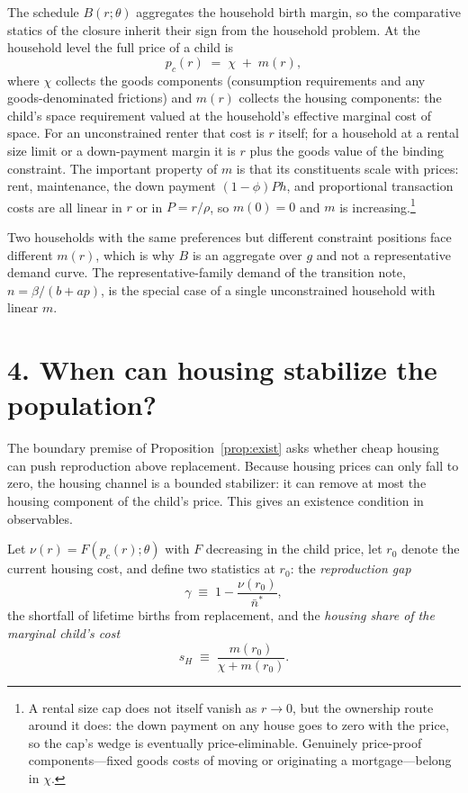 \documentclass[11pt]{article}
\theoremstyle{definition}
\begin{document}
The schedule $B(r;\theta)$ aggregates the household birth margin, so the
comparative statics of the closure inherit their sign from the household
problem. At the household level the full price of a child is
\begin{equation}
p_c(r)\;=\;\chi\;+\;m(r),
\label{eq:childprice}
\end{equation}
where $\chi$ collects the goods components (consumption requirements and any
goods-denominated frictions) and $m(r)$ collects the housing components: the
child's space requirement valued at the household's effective marginal cost of
space. For an unconstrained renter that cost is $r$ itself; for a household at
a rental size limit or a down-payment margin it is $r$ plus the goods value of
the binding constraint. The important property of $m$ is that its constituents
scale with prices: rent, maintenance, the down payment $(1-\phi)P h$, and
proportional transaction costs are all linear in $r$ or in $P=r/\rho$, so
$m(0)=0$ and $m$ is increasing.\footnote{A rental size cap does not itself
vanish as $r\to0$, but the ownership route around it does: the down payment on
any house goes to zero with the price, so the cap's wedge is eventually
price-eliminable. Genuinely price-proof components---fixed goods costs of
moving or originating a mortgage---belong in $\chi$.}

Two households with the same preferences but different constraint positions
face different $m(r)$, which is why $B$ is an aggregate over $g$ and not a
representative demand curve. The representative-family demand of the
transition note, $n=\beta/(b+ap)$, is the special case of a single
unconstrained household with linear $m$.

\section*{4. When can housing stabilize the population?}

The boundary premise of Proposition~\ref{prop:exist} asks whether cheap
housing can push reproduction above replacement. Because housing prices can
only fall to zero, the housing channel is a bounded stabilizer: it can remove
at most the housing component of the child's price. This gives an existence
condition in observables.

Let $\nu(r)=F\!\left(p_c(r);\theta\right)$ with $F$ decreasing in the child
price, let $r_0$ denote the current housing cost, and define two statistics at
$r_0$: the \emph{reproduction gap}
\[
\gamma\;\equiv\;1-\frac{\nu(r_0)}{\bar n^{*}},
\]
the shortfall of lifetime births from replacement, and the \emph{housing share
of the marginal child's cost}
\[
s_H\;\equiv\;\frac{m(r_0)}{\chi+m(r_0)} .
\]
\end{document}

